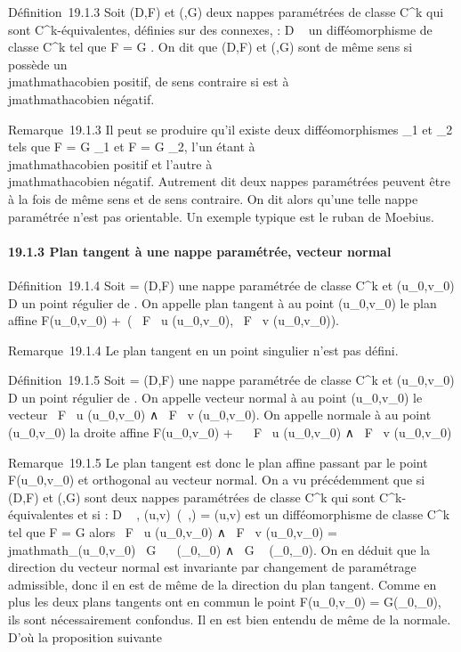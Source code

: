 \documentclass[]{article}
\begin{document}
Définition~19.1.3 Soit (D,F) et (\Delta,G) deux nappes paramétrées de classe
C^k qui sont C^k-équivalentes, définies sur des
connexes, \theta : D \rightarrow~ \Delta un difféomorphisme de classe C^k tel que
F = G \cdot \theta. On dit que (D,F) et (\Delta,G) sont de même sens si \theta possède un
\\jmathmathacobien positif, de sens contraire si \theta est à \\jmathmathacobien négatif.

Remarque~19.1.3 Il peut se produire qu'il existe deux difféomorphismes
\theta_1 et \theta_2 tels que F = G \cdot \theta_1 et F = G \cdot
\theta_2, l'un étant à \\jmathmathacobien positif et l'autre à \\jmathmathacobien
négatif. Autrement dit deux nappes paramétrées peuvent être à la fois de
même sens et de sens contraire. On dit alors qu'une telle nappe
paramétrée n'est pas orientable. Un exemple typique est le ruban de
Moebius.

\paragraph{19.1.3 Plan tangent à une nappe paramétrée, vecteur normal}

Définition~19.1.4 Soit \Gamma = (D,F) une nappe paramétrée de classe
C^k et (u_0,v_0) \in D un point régulier de
\Sigma. On appelle plan tangent à \Sigma au point (u_0,v_0) le
plan affine F(u_0,v_0) +\
\mathrmVect( \partial~F \over \partial~u
(u_0,v_0), \partial~F \over \partial~v
(u_0,v_0)).

Remarque~19.1.4 Le plan tangent en un point singulier n'est pas défini.

Définition~19.1.5 Soit \Sigma = (D,F) une nappe paramétrée de classe
C^k et (u_0,v_0) \in D un point régulier de
\Sigma. On appelle vecteur normal à \Sigma au point (u_0,v_0) le
vecteur  \partial~F \over \partial~u (u_0,v_0) ∧
\partial~F \over \partial~v (u_0,v_0). On appelle
normale à \Sigma au point (u_0,v_0) la droite affine
F(u_0,v_0) + ~ \partial~F \over \partial~u
(u_0,v_0) ∧ \partial~F \over \partial~v
(u_0,v_0)

Remarque~19.1.5 Le plan tangent est donc le plan affine passant par le
point F(u_0,v_0) et orthogonal au vecteur normal. On a
vu précédemment que si (D,F) et (\Delta,G) sont deux nappes paramétrées de
classe C^k qui sont C^k-équivalentes et si \theta : D \rightarrow~
\Delta, (u,v)\mapsto~(\lambda~,\mu) = \theta(u,v) est un
difféomorphisme de classe C^k tel que F = G \cdot \theta alors  \partial~F
\over \partial~u (u_0,v_0) ∧ \partial~F
\over \partial~v (u_0,v_0) =
\\jmathmath_\theta(u_0,v_0) \partial~G \over \partial~\lambda~
(\lambda_0,\mu_0) ∧ \partial~G \over \partial~\mu
(\lambda_0,\mu_0). On en déduit que la direction du vecteur
normal est invariante par changement de paramétrage admissible, donc il
en est de même de la direction du plan tangent. Comme en plus les deux
plans tangents ont en commun le point F(u_0,v_0) =
G(\lambda_0,\mu_0), ils sont nécessairement confondus. Il en
est bien entendu de même de la normale. D'où la proposition suivante
\end{document}
